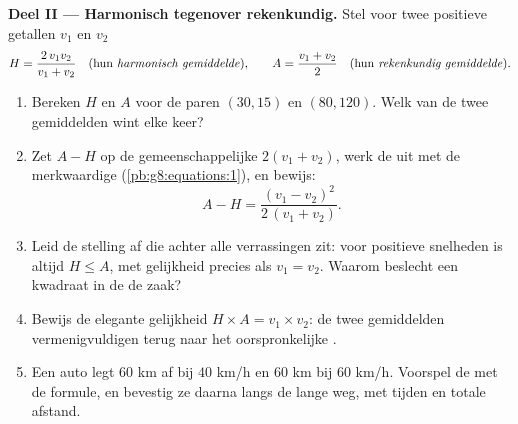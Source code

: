 \begin{problem}
\medskip
\noindent\textbf{Deel II --- Harmonisch tegenover rekenkundig.}
Stel voor twee positieve getallen $v_1$ en $v_2$
\[
H = \frac{2\, v_1 v_2}{v_1 + v_2}
\quad\text{(hun \emph{harmonisch gemiddelde}),}
\qquad
A = \frac{v_1 + v_2}{2}
\quad\text{(hun \emph{rekenkundig gemiddelde}).}
\]
\begin{enumerate}[resume]
  \item Bereken $H$ en $A$ voor de paren $(30, 15)$ en $(80, 120)$. Welk van de
        twee gemiddelden wint elke keer?
  \item Zet $A - H$ op de gemeenschappelijke  $2(v_1 + v_2)$, werk de
         uit met de merkwaardige  (\cref{pb:g8:equations:1}), en
        bewijs:
        \[
        A - H = \frac{(v_1 - v_2)^2}{2\,(v_1 + v_2)} .
        \]
  \item Leid de stelling af die achter alle verrassingen zit: voor positieve
        snelheden is altijd $H \leq A$, met gelijkheid precies als $v_1 = v_2$.
        Waarom beslecht een kwadraat in de  de zaak?
  \item Bewijs de elegante gelijkheid $H \times A = v_1 \times v_2$: de twee
        gemiddelden vermenigvuldigen terug naar het oorspronkelijke .
  \item Een auto legt $60$ km af bij $40$ km/h en $60$ km bij $60$ km/h.
        Voorspel de  met de formule, en bevestig ze daarna
        langs de lange weg, met tijden en totale afstand.
\end{enumerate}


\end{problem}
